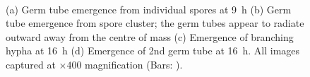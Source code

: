 \begin{figure}[tb]
	\centering
	\hspace{0.5cm}
	\\
	\hspace{0.5cm}
	\caption{(a) Germ tube emergence from individual spores at 9~h (b) Germ tube emergence from spore cluster; the germ tubes appear to radiate outward away from the centre of mass (c) Emergence of branching hypha at 16~h (d) Emergence of 2nd germ tube at 16~h. All images captured at $\times 400$ magnification (Bars: ).}
	\label{fig:KeyPoints}
\end{figure}

